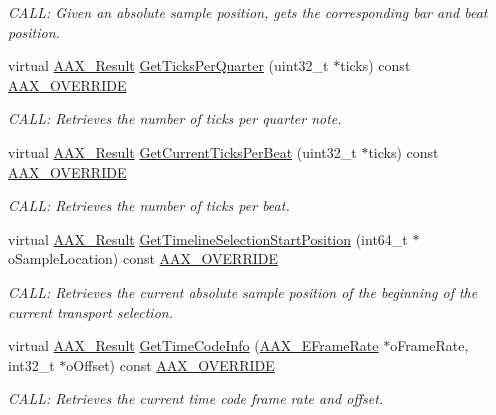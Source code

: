 \begin{DoxyCompactItemize}
\begin{DoxyCompactList}\small\item\em C\+A\+L\+L\+: Given an absolute sample position, gets the corresponding bar and beat position. \end{DoxyCompactList}\item 
virtual \hyperlink{a00149_a4d8f69a697df7f70c3a8e9b8ee130d2f}{A\+A\+X\+\_\+\+Result} \hyperlink{a00141_a9364a5e208d1b8c36bb93c4b4a4ecfca}{Get\+Ticks\+Per\+Quarter} (uint32\+\_\+t $\ast$ticks) const \hyperlink{a00149_ac2f24a5172689ae684344abdcce55463}{A\+A\+X\+\_\+\+O\+V\+E\+R\+R\+I\+D\+E}
\begin{DoxyCompactList}\small\item\em C\+A\+L\+L\+: Retrieves the number of ticks per quarter note. \end{DoxyCompactList}\item 
virtual \hyperlink{a00149_a4d8f69a697df7f70c3a8e9b8ee130d2f}{A\+A\+X\+\_\+\+Result} \hyperlink{a00141_ae99613747af9f1478defe4e607c96eec}{Get\+Current\+Ticks\+Per\+Beat} (uint32\+\_\+t $\ast$ticks) const \hyperlink{a00149_ac2f24a5172689ae684344abdcce55463}{A\+A\+X\+\_\+\+O\+V\+E\+R\+R\+I\+D\+E}
\begin{DoxyCompactList}\small\item\em C\+A\+L\+L\+: Retrieves the number of ticks per beat. \end{DoxyCompactList}\item 
virtual \hyperlink{a00149_a4d8f69a697df7f70c3a8e9b8ee130d2f}{A\+A\+X\+\_\+\+Result} \hyperlink{a00141_a4c5965a71f6a19aaf8e94f5592f216c1}{Get\+Timeline\+Selection\+Start\+Position} (int64\+\_\+t $\ast$o\+Sample\+Location) const \hyperlink{a00149_ac2f24a5172689ae684344abdcce55463}{A\+A\+X\+\_\+\+O\+V\+E\+R\+R\+I\+D\+E}
\begin{DoxyCompactList}\small\item\em C\+A\+L\+L\+: Retrieves the current absolute sample position of the beginning of the current transport selection. \end{DoxyCompactList}\item 
virtual \hyperlink{a00149_a4d8f69a697df7f70c3a8e9b8ee130d2f}{A\+A\+X\+\_\+\+Result} \hyperlink{a00141_a2d45370f36eb2d99654945d0260c383f}{Get\+Time\+Code\+Info} (\hyperlink{a00206_a1271a51553bf508de59864334111aa8f}{A\+A\+X\+\_\+\+E\+Frame\+Rate} $\ast$o\+Frame\+Rate, int32\+\_\+t $\ast$o\+Offset) const \hyperlink{a00149_ac2f24a5172689ae684344abdcce55463}{A\+A\+X\+\_\+\+O\+V\+E\+R\+R\+I\+D\+E}
\begin{DoxyCompactList}\small\item\em C\+A\+L\+L\+: Retrieves the current time code frame rate and offset. \end{DoxyCompactList}\item 

\end{DoxyCompactItemize}
